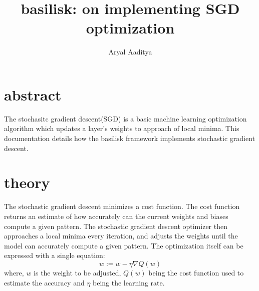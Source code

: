 \documentclass[a4paper,11pt]{article}
\title{\vspace{-1.0cm}basilisk: on implementing SGD optimization}
\author{Aryal Aaditya}
\begin{document}
  \maketitle
  \section{abstract}
	The stochasitc gradient descent(SGD) is a basic machine 
	learning optimization algorithm which updates a layer's weights to approach of local minima. This documentation 
  details how the basilisk framework implements stochastic gradient descent.

  \section{theory}
  The stochastic gradient descent minimizes a cost function.
  The cost function returns an estimate of how accurately can the current weights and biases compute a given pattern.
  The stochastic gradient descent optimizer then approaches a local minima every iteration, and adjusts the weights until
  the model can accurately compute a given pattern. The optimization itself can be expressed with a single equation:
  \begin{equation}
    w := w - \eta \nabla Q(w) 
  \end{equation}
  where, \(w\) is the weight to be adjusted, \(Q(w)\) being the 
  cost function used to estimate the accuracy and \(\eta\) being the learning rate.
  
\end{document}

